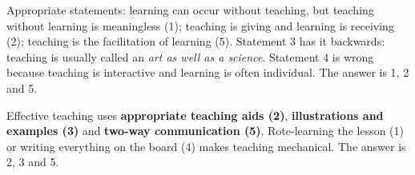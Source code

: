 Appropriate statements: learning can occur without teaching, but teaching without learning is meaningless (1); teaching is giving and learning is receiving (2); teaching is the facilitation of learning (5).
Statement 3 has it backwards: teaching is usually called an \emph{art as well as a science}. Statement 4 is wrong because teaching is interactive and learning is often individual. The answer is 1, 2 and 5.

Effective teaching uses \textbf{appropriate teaching aids (2)}, \textbf{illustrations and examples (3)} and \textbf{two-way communication (5)}. Rote-learning the lesson (1) or writing everything on the board (4) makes teaching mechanical. The answer is 2, 3 and 5.
